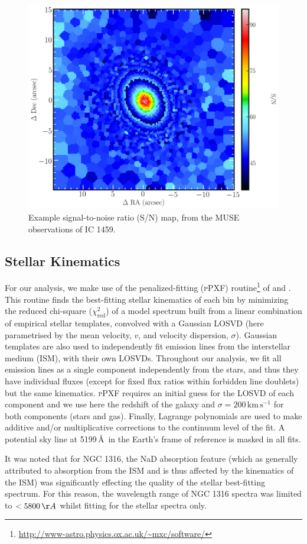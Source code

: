 		\begin{figure}
			\centering
			\includegraphics[width=.6\textwidth]{chapter2/egSNR.png}
			\caption[Example signal-to-noise map]{Example signal-to-noise ratio (S/N) map, from the MUSE observations of IC 1459.}
			\label{fig:egSNR}
		\end{figure}

	\subsection{Stellar Kinematics}
		\label{subsec:StellarFit}
		For our analysis, we make use of the penalized-fitting (\textsc{pPXF}) routine\footnote{\url{http://www-astro.physics.ox.ac.uk/~mxc/software/}} of \citet{Cappellari2004} and \citet{Cappellari2016a}. This routine finds the best-fitting stellar kinematics of each bin by minimizing the reduced chi-square ($\chi^2_\text{red}$) of a model spectrum built from a linear combination of empirical stellar templates, convolved with a Gaussian LOSVD (here parametrised by the mean velocity, $v$, and velocity dispersion, $\sigma$). Gaussian templates are also used to independently fit emission lines from the interstellar medium (ISM), with their own LOSVDs. Throughout our analysis, we fit all emission lines as a single component independently from the stars, and thus they have individual fluxes (except for fixed flux ratios within forbidden line doublets) but the same kinematics. \textsc{pPXF} requires an initial guess for the LOSVD of each component and we use here the redshift of the galaxy and $\sigma = 200\,\mathrm{km\,s^{-1}}$ for both components (stars and gas). Finally, Lagrange polynomials are used to make additive and/or multiplicative corrections to the continuum level of the fit. A potential sky line at 5199\,\AA\ in the Earth's frame of reference is masked in all fits.

		It was noted that for NGC 1316, the NaD absorption feature (which as generally attributed to absorption from the ISM and is thus affected by the kinematics of the ISM) was significantly effecting the quality of the stellar best-fitting spectrum. For this reason, the wavelength range of NGC 1316 spectra was limited to $<5800 \, \AA$ whilst fitting for the stellar spectra only.

